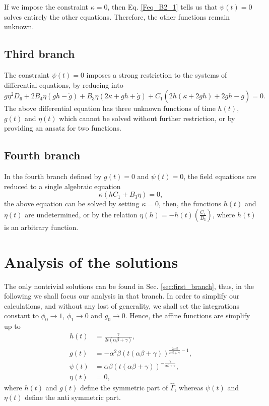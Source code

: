 If we impose the constraint $\kappa = 0$, then Eq. \eqref{Feq_B2_1} tells us that $\psi(t) = 0$ solves entirely the other
equations. Therefore, the other functions remain unknown.

\subsection{Third branch}

The constraint $\psi(t)=0$ imposes a strong restriction to the systems of differential equations, by reducing into
\begin{dmath}
    g\eta^2D_6 + 2B_4\eta \left(gh - \dot{g}\right) + B_3\eta\left(2\kappa + gh + \dot{g}\right) + 
    C_1\left(2h\left(\kappa + 2gh\right) + 2g\dot{h} - \ddot{g}\right) = 0.
\end{dmath}
The above differential equation has three unknown functions of time $h(t)$, $g(t)$ and $\eta(t)$ which cannot be solved without 
further restriction, or by providing an ansatz for two functions.

\subsection{Fourth branch}

In the fourth branch defined by $g(t) = 0$ and $\psi (t) = 0$, the field equations are reduced
to a single algebraic equation
\begin{equation}
    \kappa\left(hC_1 + B_3\eta\right) = 0,
\end{equation}
the above equation can be solved by setting $\kappa = 0$, then, the functions $h(t)$ and $\eta(t)$ are undetermined,
or by the relation $\eta(h) = - h(t)\left(\frac{C_1}{B_3}\right)$, where $h(t)$ is an arbitrary function.

\section{Analysis of the solutions}
\label{sec:analysis}

The only nontrivial solutions can be found in Sec. \ref{sec:first_branch}, thus, in the following we shall
focus our analysis in that branch. In order to simplify our calculations, and without any lost of generality, we shall
set the integrations constant to $\phi_0 \to 1$, $\phi_1 \to 0$ and $g_0 \to 0$. Hence, the affine functions 
are simplify up to
\begin{align}
	h(t) & = \frac{\gamma}{2t\left(\alpha\beta + \gamma\right)}, \label{sol_h}\\
	g(t) & = -\alpha^2\beta \left(t\left(\alpha\beta + \gamma\right)\right)^{\frac{2\alpha\beta}{\alpha\beta + \gamma} -1}, \label{sol_g} \\
	\psi(t) & = \alpha\beta\left(t\left(\alpha\beta + \gamma\right)\right)^{-\frac{\gamma}{\alpha\beta + \gamma}},  \label{sol_p}\\ 
	\eta(t) & = 0, \label{sol_n}
\end{align}
where $h(t)$ and $g(t)$ define the symmetric part of $\hat{\Gamma}$, whereas
$\psi(t)$ and $\eta(t)$ define the anti symmetric part.

